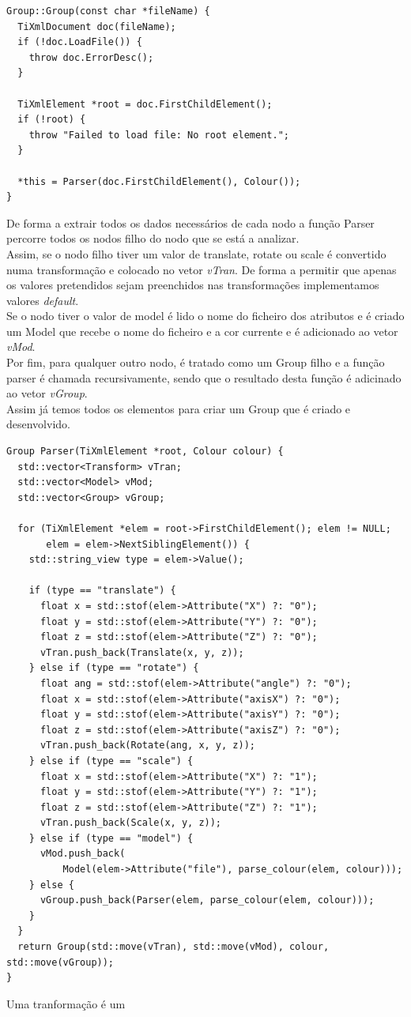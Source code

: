\documentclass[a4paper]{report}
\begin{document}
\begin{lstlisting}
Group::Group(const char *fileName) {
  TiXmlDocument doc(fileName);
  if (!doc.LoadFile()) {
    throw doc.ErrorDesc();
  }

  TiXmlElement *root = doc.FirstChildElement();
  if (!root) {
    throw "Failed to load file: No root element.";
  }

  *this = Parser(doc.FirstChildElement(), Colour());
}
\end{lstlisting}
De forma a extrair todos os dados necessários de cada nodo a função Parser
percorre todos os nodos filho do nodo que se está a analizar.\\
Assim, se o nodo filho tiver um valor de translate, rotate ou scale é convertido
numa transformação e colocado no vetor \textit{vTran}. De forma a permitir que
apenas os valores pretendidos sejam preenchidos nas transformações implementamos
valores \textit{default}.\\
Se o nodo tiver o valor de model é lido o nome do ficheiro dos atributos e é
criado um Model que recebe o nome do ficheiro e a cor currente e é adicionado ao
vetor \textit{vMod}.\\
Por fim, para qualquer outro nodo, é tratado como um Group filho e a função
parser é chamada recursivamente, sendo que o resultado desta função é adicinado
ao vetor \textit{vGroup}.\\
Assim já temos todos os elementos para criar um Group que é criado e
desenvolvido.

\begin{lstlisting}
Group Parser(TiXmlElement *root, Colour colour) {
  std::vector<Transform> vTran;
  std::vector<Model> vMod;
  std::vector<Group> vGroup;

  for (TiXmlElement *elem = root->FirstChildElement(); elem != NULL;
       elem = elem->NextSiblingElement()) {
    std::string_view type = elem->Value();

    if (type == "translate") {
      float x = std::stof(elem->Attribute("X") ?: "0");
      float y = std::stof(elem->Attribute("Y") ?: "0");
      float z = std::stof(elem->Attribute("Z") ?: "0");
      vTran.push_back(Translate(x, y, z));
    } else if (type == "rotate") {
      float ang = std::stof(elem->Attribute("angle") ?: "0");
      float x = std::stof(elem->Attribute("axisX") ?: "0");
      float y = std::stof(elem->Attribute("axisY") ?: "0");
      float z = std::stof(elem->Attribute("axisZ") ?: "0");
      vTran.push_back(Rotate(ang, x, y, z));
    } else if (type == "scale") {
      float x = std::stof(elem->Attribute("X") ?: "1");
      float y = std::stof(elem->Attribute("Y") ?: "1");
      float z = std::stof(elem->Attribute("Z") ?: "1");
      vTran.push_back(Scale(x, y, z));
    } else if (type == "model") {
      vMod.push_back(
          Model(elem->Attribute("file"), parse_colour(elem, colour)));
    } else {
      vGroup.push_back(Parser(elem, parse_colour(elem, colour)));
    }
  }
  return Group(std::move(vTran), std::move(vMod), colour, std::move(vGroup));
}
\end{lstlisting}
Uma tranformação é um 
\end{document}

